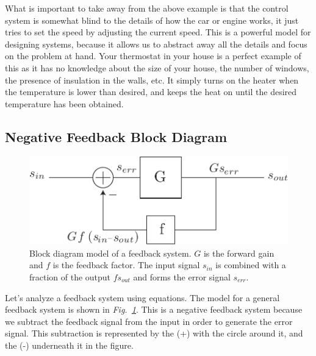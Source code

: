 What is important to take away from the above example is that the control system is somewhat blind to the details of how the car or engine works, it just tries to set the speed by adjusting the current speed.  This is a powerful model for designing systems, because it allows us to abstract away all the details and focus on the problem at hand.  Your thermostat in your house is a perfect example of this as it has no knowledge about the size of your house, the number of windows, the presence of insulation in the walls, etc.  It simply turns on the heater when the temperature is lower than desired, and keeps the heat on until the desired temperature has been obtained.  
\subsection{Negative Feedback Block Diagram}
\begin{figure}[tb]
\centering
\includegraphics[scale=.7]{fbblock2}
\caption{Block diagram model of a feedback system.  $G$ is the forward gain and $f$ is the feedback factor.  The input signal $s_{in}$ is combined with a fraction of the output $f s_{out}$ and forms the error signal $s_{err}$.}
\label{fig:fbblock2}
\end{figure}
Let's analyze a feedback system using equations.  The model for a general feedback system is shown in \emph{Fig.~\ref{fig:fbblock2}}.  This is a negative feedback system because we subtract the feedback signal from the input in order to generate the error signal.  This subtraction is represented by the (+) with the circle around it, and the (-) underneath it in the figure.


